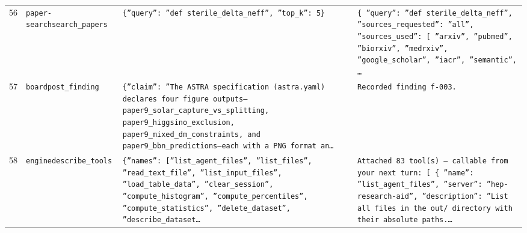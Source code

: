 \documentclass[11pt,a4paper]{article}
\begin{document}
\begin{longtable}{@{}p{}p{}p{}p{}@{}}
56 & \texttt{paper-search}\newline\texttt{search\_\allowbreak{}papers} & \texttt{\{''query'':\allowbreak{} ''def sterile\_\allowbreak{}delta\_\allowbreak{}neff'',\allowbreak{} ''top\_\allowbreak{}k'':\allowbreak{} 5\}\allowbreak{}} & \texttt{\{   ''query'':\allowbreak{} ''def sterile\_\allowbreak{}delta\_\allowbreak{}neff'',\allowbreak{}   ''sources\_\allowbreak{}requested'':\allowbreak{} ''all'',\allowbreak{}   ''sources\_\allowbreak{}used'':\allowbreak{} [     ''arxiv'',\allowbreak{}     ''pubmed'',\allowbreak{}     ''biorxiv'',\allowbreak{}     ''medrxiv'',\allowbreak{}     ''google\_\allowbreak{}scholar'',\allowbreak{}     ''iacr'',\allowbreak{}     ''semantic'',\allowbreak{}     \ldots{}\allowbreak{}} \\
57 & \texttt{board}\newline\texttt{post\_\allowbreak{}finding} & \texttt{\{''claim'':\allowbreak{} ''The ASTRA specification (astra.yaml)\allowbreak{} declares four figure outputs---paper9\_\allowbreak{}solar\_\allowbreak{}capture\_\allowbreak{}vs\_\allowbreak{}splitting,\allowbreak{} paper9\_\allowbreak{}higgsino\_\allowbreak{}exclusion,\allowbreak{} paper9\_\allowbreak{}mixed\_\allowbreak{}dm\_\allowbreak{}constraints,\allowbreak{} and paper9\_\allowbreak{}bbn\_\allowbreak{}predictions---each with a PNG format an\ldots{}\allowbreak{}} & \texttt{Recorded finding f-003.} \\
58 & \texttt{engine}\newline\texttt{describe\_\allowbreak{}tools} & \texttt{\{''names'':\allowbreak{} [''list\_\allowbreak{}agent\_\allowbreak{}files'',\allowbreak{} ''list\_\allowbreak{}files'',\allowbreak{} ''read\_\allowbreak{}text\_\allowbreak{}file'',\allowbreak{} ''list\_\allowbreak{}input\_\allowbreak{}files'',\allowbreak{} ''load\_\allowbreak{}table\_\allowbreak{}data'',\allowbreak{} ''clear\_\allowbreak{}session'',\allowbreak{} ''compute\_\allowbreak{}histogram'',\allowbreak{} ''compute\_\allowbreak{}percentiles'',\allowbreak{} ''compute\_\allowbreak{}statistics'',\allowbreak{} ''delete\_\allowbreak{}dataset'',\allowbreak{} ''describe\_\allowbreak{}dataset\ldots{}\allowbreak{}} & \texttt{Attached 83 tool(s)\allowbreak{} --- callable from your next turn:\allowbreak{} [  \{   ''name'':\allowbreak{} ''list\_\allowbreak{}agent\_\allowbreak{}files'',\allowbreak{}   ''server'':\allowbreak{} ''hep-research-aid'',\allowbreak{}   ''description'':\allowbreak{} ''List all files in the out/\allowbreak{} directory with their absolute paths.\ldots{}\allowbreak{}} \\

\end{longtable}
\end{document}
